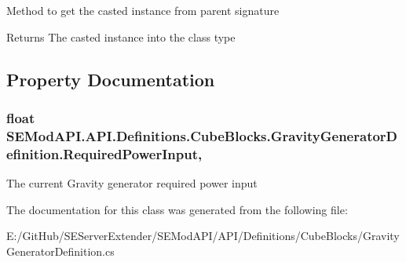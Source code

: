 Method to get the casted instance from parent signature 

\begin{DoxyReturn}{Returns}
The casted instance into the class type
\end{DoxyReturn}


\subsection{Property Documentation}
\hypertarget{class_s_e_mod_a_p_i_1_1_a_p_i_1_1_definitions_1_1_cube_blocks_1_1_gravity_generator_definition_a0e2839258e03decff26098c2e76ee0e2}{}
\subsubsection[{Required\+Power\+Input}]{\setlength{\rightskip}{0pt plus 5cm}float S\+E\+Mod\+A\+P\+I.\+A\+P\+I.\+Definitions.\+Cube\+Blocks.\+Gravity\+Generator\+Definition.\+Required\+Power\+Input\hspace{0.3cm}{\ttfamily [get]}, {\ttfamily [set]}}\label{class_s_e_mod_a_p_i_1_1_a_p_i_1_1_definitions_1_1_cube_blocks_1_1_gravity_generator_definition_a0e2839258e03decff26098c2e76ee0e2}


The current Gravity generator required power input 



The documentation for this class was generated from the following file\+:\begin{DoxyCompactItemize}
\item 
E\+:/\+Git\+Hub/\+S\+E\+Server\+Extender/\+S\+E\+Mod\+A\+P\+I/\+A\+P\+I/\+Definitions/\+Cube\+Blocks/Gravity\+Generator\+Definition.\+cs\end{DoxyCompactItemize}
